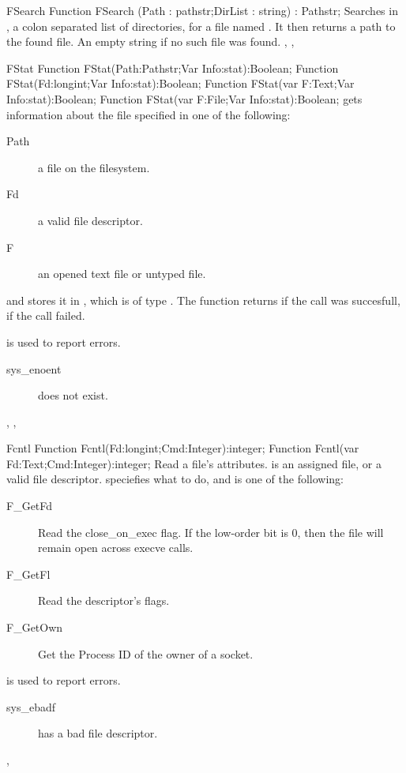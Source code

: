
\begin{function}{FSearch}
\Declaration
Function FSearch (Path : pathstr;DirList : string) : Pathstr;
\Description
 Searches in , a colon separated list of directories,
for a file named . It then returns a path to the found file.
\Errors
An empty string if no such file was found.
\SeeAlso
{}, ,  
\end{function}


\begin{function}{FStat}
\Declaration
Function FStat(Path:Pathstr;Var Info:stat):Boolean;
Function FStat(Fd:longint;Var Info:stat):Boolean;  
Function FStat(var F:Text;Var Info:stat):Boolean;  
Function FStat(var F:File;Var Info:stat):Boolean;  
\Description
{} gets information about the file specified in one of the
following:
\begin{description}
\item [Path] a file on the filesystem.
\item [Fd] a valid file descriptor.
\item [F] an opened text file or untyped file.
\end{description}
and stores it in  , which is of type .
The function returns  if the call was succesfull, 
 if the call failed.

\Errors
  is used to report errors.
\begin{description}
\item[sys\_enoent]  does not exist.
\end{description}
\SeeAlso
{}, , 
\end{function}


\begin{function}{Fcntl}
\Declaration
Function  Fcntl(Fd:longint;Cmd:Integer):integer;
Function  Fcntl(var Fd:Text;Cmd:Integer):integer;   
\Description
Read a file's attributes.  is an assigned file, or a valid file
descriptor.
 speciefies what to do, and is one of the following:
\begin{description}
\item[F\_GetFd] Read the close\_on\_exec flag. If the low-order bit is 0, then
the file will remain open across execve calls.
\item[F\_GetFl] Read the descriptor's flags.
\item[F\_GetOwn] Get the Process ID of the owner of a socket.
\end{description}

\Errors
{} is used to report errors.
\begin{description}
\item[sys\_ebadf]  has a bad file descriptor.
\end{description}

\SeeAlso
{},  
\end{function}

